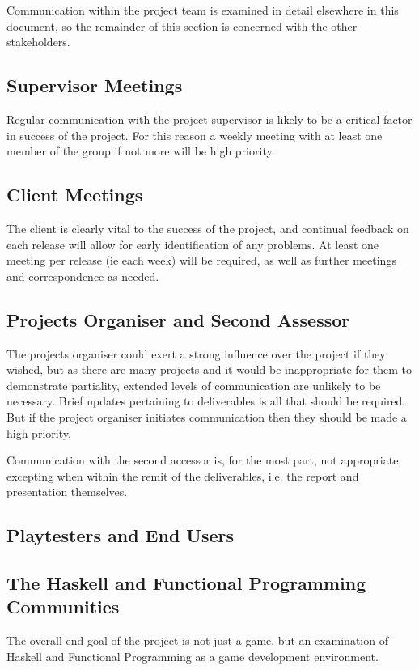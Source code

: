 \noindent Communication within the project team is examined in detail elsewhere in this document, so the remainder of this section is concerned with the other stakeholders.

\subsection{Supervisor Meetings}

Regular communication with the project supervisor is likely to be a critical factor in success of the project. For this reason a weekly meeting with at least one member of the group if not more will be high priority.

\subsection{Client Meetings}

The client is clearly vital to the success of the project, and continual feedback on each release will allow for early identification of any problems. At least one meeting per release (ie each week) will be required, as well as further meetings and correspondence as needed.

\subsection{Projects Organiser and Second Assessor}

The projects organiser could exert a strong influence over the project if they wished, but as there are many projects and it would be inappropriate for them to demonstrate partiality, extended levels of communication are unlikely to be necessary. Brief updates pertaining to deliverables is all that should be required. But if the project organiser initiates communication then they should be made a high priority.

Communication with the second accessor is, for the most part, not appropriate, excepting when within the remit of the deliverables, i.e. the report and presentation themselves.

\subsection{Playtesters and End Users}

\subsection{The Haskell and Functional Programming Communities}

The overall end goal of the project is not just a game, but an examination of Haskell and Functional Programming as a game development environment. 


